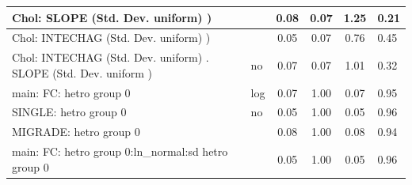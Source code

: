 \begin{table}
\begin{center}
\begin{tabular}{|l|l|c|c|c|l|}
			\hline
			 Chol: SLOPE (Std. Dev. uniform) ) &  & 0.08 & 0.07 & 1.25 & 0.21 \\
			\hline
			 Chol: INTECHAG (Std. Dev. uniform) ) &  & 0.05 & 0.07 & 0.76 & 0.45 \\
			\hline
			 Chol: INTECHAG (Std. Dev. uniform) . SLOPE (Std. Dev.   uniform ) & no & 0.07 & 0.07 & 1.01 & 0.32 \\
			\hline
			main: FC: hetro group 0 & log & 0.07 & 1.00 & 0.07 & 0.95 \\
			\hline
			SINGLE: hetro group 0 & no & 0.05 & 1.00 & 0.05 & 0.96 \\
			\hline
			MIGRADE: hetro group 0 &  & 0.08 & 1.00 & 0.08 & 0.94 \\
			\hline
			main: FC: hetro group 0:ln_normal:sd  hetro group 0 &  & 0.05 & 1.00 & 0.05 & 0.96 \\
			\hline
		\end{tabular}
	\end{center}
\end{table}